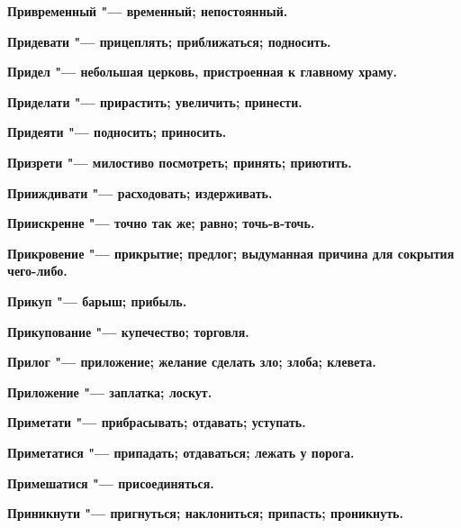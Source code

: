 \bfseries Привременный \normalfont{} "--- временный; непостоянный. 




\bfseries Придевати \normalfont{} "--- прицеплять; приближаться; подносить. 




\bfseries Придел \normalfont{} "--- небольшая церковь, пристроенная к главному храму. 




\bfseries Приделати \normalfont{} "--- прирастить; увеличить; принести. 




\bfseries Придеяти \normalfont{} "--- подносить; приносить. 




\bfseries Призрети \normalfont{} "--- милостиво посмотреть; принять; приютить. 




\bfseries Прииждивати \normalfont{} "--- расходовать; издерживать. 




\bfseries Приискренне \normalfont{} "--- точно так же; равно; точь-в-точь. 




\bfseries Прикровение \normalfont{} "--- прикрытие; предлог; выдуманная причина для сокрытия чего-либо. 




\bfseries Прикуп \normalfont{} "--- барыш; прибыль. 




\bfseries Прикупование \normalfont{} "--- купечество; торговля. 




\bfseries Прилог \normalfont{} "--- приложение; желание сделать зло; злоба; клевета. 




\bfseries Приложение \normalfont{} "--- заплатка; лоскут. 




\bfseries Приметати \normalfont{} "--- прибрасывать; отдавать; уступать. 




\bfseries Приметатися \normalfont{} "--- припадать; отдаваться; лежать у порога. 




\bfseries Примешатися \normalfont{} "--- присоединяться. 




\bfseries Приникнути \normalfont{} "--- пригнуться; наклониться; припасть; проникнуть. 




